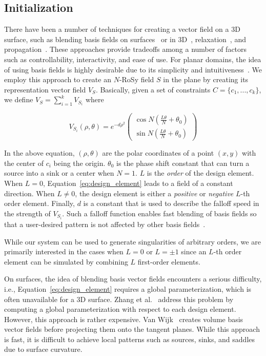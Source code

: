 \documentclass{acmsiggraph}               %
\begin{document}
\subsection{Initialization}
\label{sec:initialization}

There have been a number of techniques for creating a vector field
on a 3D surface, such as blending basis fields on
surfaces~\cite{Zhang:06} or in 3D~\cite{vanWijk:03},
relaxation~\cite{Turk:01,Wei:01}, and propagation~\cite{Praun:00}.
These approaches provide tradeoffs among a number of factors such as
controllability, interactivity, and ease of use. For planar domains,
the idea of using basis fields is highly desirable due to its
simplicity and intuitiveness~\cite{vanWijk:02}. We employ this
approach to create an $N$-RoSy field $S$ in the plane by creating
its representation vector field $V_S$. Basically, given a set of
constraints $C = \{c_1, ..., c_k\}$, we define $V_S = \sum_{i=1}^k
V_{S_i}$ where

\begin{equation}
V_{S_i}(\rho, \theta) =e^{-d\rho^2}\begin{pmatrix} \cos
N(\frac{L\theta}{N}+\theta_0) \\ \sin N(\frac{L\theta}{N}+\theta_0)
\end{pmatrix} \label{eq:design_element}
\end{equation}

\noindent In the above equation, $(\rho, \theta)$ are the polar
coordinates of a point $(x, y)$ with the center of $c_i$ being the
origin. $\theta_0$ is the phase shift constant that can turn a
source into a sink or a center when $N=1$. $L$ is the {\em order} of
the design element. When $L=0$, Equation~\ref{eq:design_element}
leads to a field of a constant direction. When $L \ne 0$, the design
element is either a {\em positive} or {\em negative} $L$-th order
element. Finally, $d$ is a constant that is used to describe the
falloff speed in the strength of $V_{S_i}$. Such a falloff function
enables fast blending of basis fields so that a user-desired pattern
is not affected by other basis fields~\cite{vanWijk:02}.

While our system can be used to generate singularities of arbitrary
orders, we are primarily interested in the cases when $L=0$ or
$L=\pm 1$ since an $L$-th order element can be simulated by
combining $L$ first-order elements.

On surfaces, the idea of blending basis vector fields encounters a
serious difficulty, i.e., Equation~\ref{eq:design_element} requires
a global parameterization, which is often unavailable for a 3D
surface. Zhang et al.~ address this problem by
computing a global parameterization with respect to each design
element. However, this approach is rather expensive. Van
Wijk~ creates volume basis vector fields
before projecting them onto the tangent planes. While this approach
is fast, it is difficult to achieve local patterns such as sources,
sinks, and saddles due to surface curvature.
\end{document}

